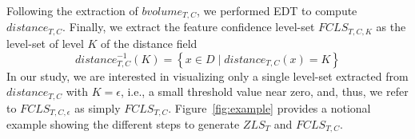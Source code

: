 %
Following the extraction of $bvolume_{T,C}$, we performed EDT to compute $distance_{T,C}$.
%
Finally, we extract the feature confidence level-set $FCLS_{T,C,K}$ as the level-set of level $K$ of the distance field
%
\begin{equation} 
distance_{T,C}^{-1}(K) = \left\{ x \in D\; |\; distance_{T,C}(x) = K\right\}
\end{equation}
%
In our study, we are interested in visualizing only a single level-set extracted from $distance_{T,C}$ with $K = \epsilon$, i.e., a small threshold value near zero, and, thus, we refer to $FCLS_{T,C,\epsilon}$ as simply $FCLS_{T,C}$.
%
Figure~\ref{fig:example} provides a notional example showing the different steps to generate $ZLS_{T}$ and $FCLS_{T,C}$.
%
